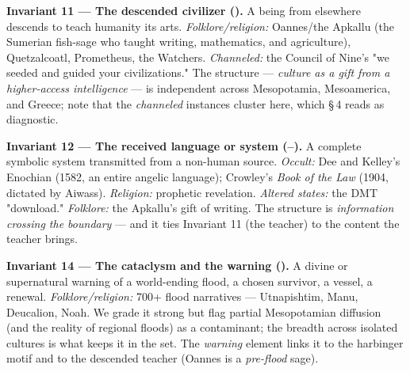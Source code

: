 \documentclass[11pt]{article}
\begin{document}
\textbf{Invariant 11 --- The descended civilizer (\CIRCLE).} A being from elsewhere descends to teach humanity its arts. \emph{Folklore/religion:} Oannes/the Apkallu (the Sumerian fish-sage who taught writing, mathematics, and agriculture), Quetzalcoatl, Prometheus, the Watchers. \emph{Channeled:} the Council of Nine's "we seeded and guided your civilizations." The structure --- \emph{culture as a gift from a higher-access intelligence} --- is independent across Mesopotamia, Mesoamerica, and Greece; note that the \emph{channeled} instances cluster here, which \S\,4 reads as diagnostic.

\textbf{Invariant 12 --- The received language or system (\LEFTcircle--\CIRCLE).} A complete symbolic system transmitted from a non-human source. \emph{Occult:} Dee and Kelley's Enochian (1582, an entire angelic language); Crowley's \emph{Book of the Law} (1904, dictated by Aiwass). \emph{Religion:} prophetic revelation. \emph{Altered states:} the DMT "download." \emph{Folklore:} the Apkallu's gift of writing. The structure is \emph{information crossing the boundary} --- and it ties Invariant 11 (the teacher) to the content the teacher brings.

\textbf{Invariant 14 --- The cataclysm and the warning (\CIRCLE).} A divine or supernatural warning of a world-ending flood, a chosen survivor, a vessel, a renewal. \emph{Folklore/religion:} 700+ flood narratives --- Utnapishtim, Manu, Deucalion, Noah. We grade it strong but flag partial Mesopotamian diffusion (and the reality of regional floods) as a contaminant; the breadth across isolated cultures is what keeps it in the set. The \emph{warning} element links it to the harbinger motif and to the descended teacher (Oannes is a \emph{pre-flood} sage).
\end{document}
